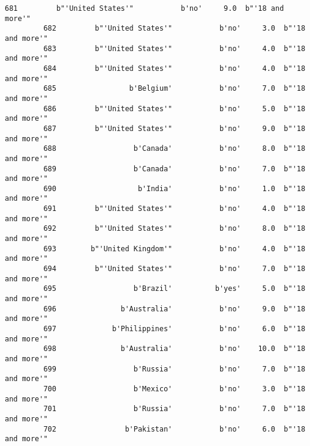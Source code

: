 \documentclass[11pt]{article}
\begin{document}
\begin{Verbatim}[commandchars=\\\{\}]
         681         b"'United States'"           b'no'     9.0  b"'18 and more'"   
         682         b"'United States'"           b'no'     3.0  b"'18 and more'"   
         683         b"'United States'"           b'no'     4.0  b"'18 and more'"   
         684         b"'United States'"           b'no'     4.0  b"'18 and more'"   
         685                 b'Belgium'           b'no'     7.0  b"'18 and more'"   
         686         b"'United States'"           b'no'     5.0  b"'18 and more'"   
         687         b"'United States'"           b'no'     9.0  b"'18 and more'"   
         688                  b'Canada'           b'no'     8.0  b"'18 and more'"   
         689                  b'Canada'           b'no'     7.0  b"'18 and more'"   
         690                   b'India'           b'no'     1.0  b"'18 and more'"   
         691         b"'United States'"           b'no'     4.0  b"'18 and more'"   
         692         b"'United States'"           b'no'     8.0  b"'18 and more'"   
         693        b"'United Kingdom'"           b'no'     4.0  b"'18 and more'"   
         694         b"'United States'"           b'no'     7.0  b"'18 and more'"   
         695                  b'Brazil'          b'yes'     5.0  b"'18 and more'"   
         696               b'Australia'           b'no'     9.0  b"'18 and more'"   
         697             b'Philippines'           b'no'     6.0  b"'18 and more'"   
         698               b'Australia'           b'no'    10.0  b"'18 and more'"   
         699                  b'Russia'           b'no'     7.0  b"'18 and more'"   
         700                  b'Mexico'           b'no'     3.0  b"'18 and more'"   
         701                  b'Russia'           b'no'     7.0  b"'18 and more'"   
         702                b'Pakistan'           b'no'     6.0  b"'18 and more'"   
         

\end{Verbatim}
\end{document}
